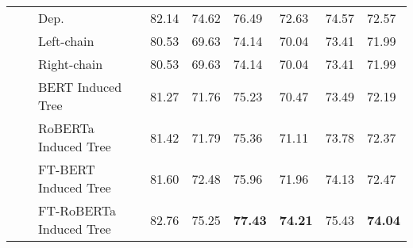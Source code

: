 \documentclass[11pt]{article}
\begin{document}
\begin{table*}[t]
\begin{tabular}{m{2cm}m{2cm}m{4.75cm}m{1.15cm}<{\centering}m{1.15cm}<{\centering}m{1.15cm}<{\centering}m{1.15cm}<{\centering}m{1.15cm}<{\centering}m{1.15cm}<{\centering}}
                                               &                                           & Dep.                            & 82.14                      & 74.62                        & 76.49                       & 72.63                    & 74.57                   & 72.57          \\
    \cmidrule(r){3-3}
                                               &                                           & Left-chain                      & 80.53                      & 69.63                        & 74.14                       & 70.04                    & 73.41                   & 71.99          \\
                                               &                                           & Right-chain\footnotemark[4]     & 80.53                      & 69.63                        & 74.14                       & 70.04                    & 73.41                   & 71.99          \\
    \cmidrule(r){3-3}
                                               &                                           & BERT Induced Tree               & 81.27                      & 71.76                        & 75.23                       & 70.47                    & 73.49                   & 72.19          \\
                                               &                                           & RoBERTa Induced Tree            & 81.42                      & 71.79                        & 75.36                       & 71.11                    & 73.78                   & 72.37          \\
    \cmidrule(r){3-3}
                                               &                                           & FT-BERT Induced Tree            & 81.60                      & 72.48                        & 75.96                       & 71.96                    & 74.13                   & 72.47          \\
                                               &                                           & FT-RoBERTa Induced Tree         & 82.76                      & 75.25                        & \textbf{77.43}              & \textbf{74.21}           & 75.43                   & \textbf{74.04} \\
    \bottomrule
  \end{tabular}

\end{table*}
\end{document}
